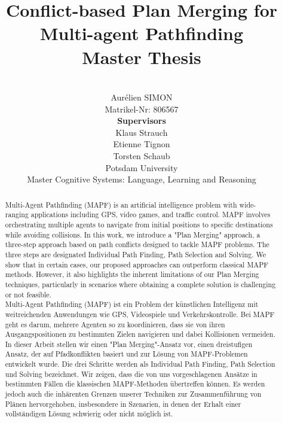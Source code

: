 \documentclass{report}
\title{%
\Huge{Conflict-based Plan Merging for Multi-agent Pathfinding}\\[0.2cm]
\Large{Master Thesis}
}
\author{
\\[1.5cm] \LARGE{Aurélien SIMON}
\\[0.2cm] \small{Matrikel-Nr: 806567 }
\\[1cm] \textbf{Supervisors}
\\[0.2cm] Klaus Strauch 
\\[0.2cm] Etienne Tignon
\\[0.2cm] Torsten Schaub
\\[2cm] \Large{Potsdam University}
\\[0.4cm] Master Cognitive Systems: Language, Learning and Reasoning 
\\[1cm]
}
\theoremstyle{definition}
\begin{document}
\pagestyle{fancy}

\maketitle


\fancyhead{} %


\newpage

\begin{abstract}
    
     Multi-Agent Pathfinding (MAPF) is an artificial intelligence problem with wide-ranging applications including GPS, video games, and traffic control. MAPF involves orchestrating multiple agents to navigate from initial positions to specific destinations while avoiding collisions. In this work, we introduce a "Plan Merging" approach, a three-step approach based on path conflicts designed to tackle MAPF problems. The three steps are designated Individual Path Finding, Path Selection and Solving. We show that in certain cases, our proposed approaches can outperform classical MAPF methods. However, it also highlights the inherent limitations of our Plan Merging techniques, particularly in scenarios where obtaining a complete solution is challenging or not feasible.
    \\[1cm]
    \indent Multi-Agent Pathfinding (MAPF) ist ein Problem der künstlichen Intelligenz mit weitreichenden Anwendungen wie GPS, Videospiele und Verkehrskontrolle. Bei MAPF geht es darum, mehrere Agenten so zu koordinieren, dass sie von ihren Ausgangspositionen zu bestimmten Zielen navigieren und dabei Kollisionen vermeiden. In dieser Arbeit stellen wir einen "Plan Merging"-Ansatz vor, einen dreistufigen Ansatz, der auf Pfadkonflikten basiert und zur Lösung von MAPF-Problemen entwickelt wurde. Die drei Schritte werden als Individual Path Finding, Path Selection und Solving bezeichnet. Wir zeigen, dass die von uns vorgeschlagenen Ansätze in bestimmten Fällen die klassischen MAPF-Methoden übertreffen können. Es werden jedoch auch die inhärenten Grenzen unserer Techniken zur Zusammenführung von Plänen hervorgehoben, insbesondere in Szenarien, in denen der Erhalt einer vollständigen Lösung schwierig oder nicht möglich ist.

\end{abstract}
\end{document}
